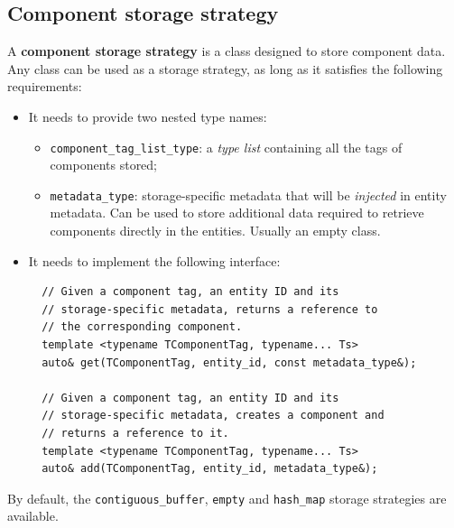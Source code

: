 \documentclass[twoside, 12pt, a4paper, openright]{book}
\begin{document}
\hypertarget{storage_comp_strategy}{\subsection{Component storage
strategy}\label{storage_comp_strategy}}

A \textbf{component storage strategy} is a class designed to store
component data. Any class can be used as a storage strategy, as long as
it satisfies the following requirements:

\begin{itemize}
\item
  It needs to provide two nested type names:

  \begin{itemize}
  \item
    \texttt{component_tag_list_type}:
    a \emph{type list} containing all the tags of components stored;
  \item
    \texttt{metadata_type}:
    storage-specific metadata that will be \emph{injected} in entity
    metadata. Can be used to store additional data required to retrieve
    components directly in the entities. Usually an empty class.
  \end{itemize}
\item
  It needs to implement the following interface:

  \begin{verbatim}
  // Given a component tag, an entity ID and its
  // storage-specific metadata, returns a reference to
  // the corresponding component.
  template <typename TComponentTag, typename... Ts>
  auto& get(TComponentTag, entity_id, const metadata_type&);

  // Given a component tag, an entity ID and its
  // storage-specific metadata, creates a component and
  // returns a reference to it.
  template <typename TComponentTag, typename... Ts>
  auto& add(TComponentTag, entity_id, metadata_type&);
  \end{verbatim}
\end{itemize}

By default, the
\texttt{contiguous_buffer},
\texttt{empty}
and
\texttt{hash_map}
storage strategies are available.
\end{document}

